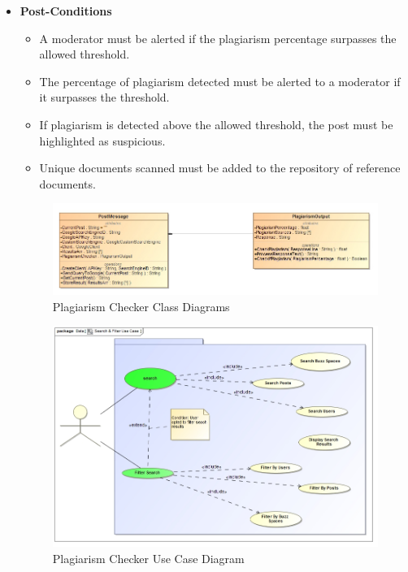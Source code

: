 \documentclass[11pt]{article}
\begin{document}
\begin{enumerate}
\begin{itemize}
\begin{itemize}
		  	\end{itemize}
		\item	\textbf{Post-Conditions}
		  	\begin{itemize}
	  			\item A moderator must be alerted if the plagiarism percentage surpasses the allowed threshold.
		  		\item The percentage of plagiarism detected must be alerted to a moderator if it surpasses the threshold.
	 			\item If plagiarism is detected above the allowed threshold, the post must be highlighted as suspicious.
		  		\item Unique documents scanned must be added to the repository of reference documents.
		  	\end{itemize}
		  	\newpage
	  			\begin{figure}[H]
	  				\includegraphics[scale=0.5]{InputOutput.jpg}
    					\caption{Plagiarism Checker Class Diagrams}
				\end{figure}
				\begin{figure}[H]
		    			\includegraphics[scale=0.4]{UseCase.jpg}
					\caption{Plagiarism Checker Use Case Diagram}
				\end{figure}
				\begin{figure}[H]

\end{figure}
\end{itemize}
\end{enumerate}
\end{document}
